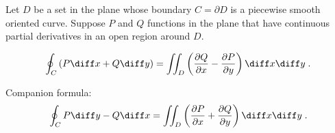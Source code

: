 \begin{frame}
\frametitle{\color{green}{Green's Theorem}}
Let $D$ be a set in the plane whose boundary $C=\partial D$ is a piecewise smooth oriented curve. Suppose $P$ and $Q$ functions in the plane that have continuous partial derivatives in an open region around $D$.
\begin{theorem}[Green]
\[
\oint_C \left( P \diff x + Q \diff y \right)= \iint_D \left( \frac{ \partial Q}{\partial x} - \frac{ \partial P}{ \partial y} \right) \diff x \diff y \; .
\]
\end{theorem}

Companion formula:
\[
\oint_C P\diff y - Q\diff x = \iint_D \left(\frac{\partial P}{ \partial x} + \frac{ \partial Q}{\partial y} \right) \diff x \diff y \; .
\]
\end{frame}